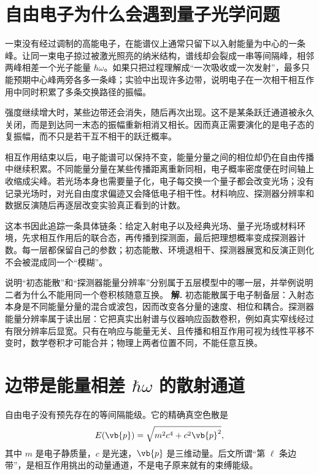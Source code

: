 \section{自由电子为什么会遇到量子光学问题}
\label{chap:feqo-phenomena}

一束没有经过调制的高能电子，在能谱仪上通常只留下以入射能量为中心的一条峰。让同一束电子掠过被激光照亮的纳米结构，谱线却会裂成一串等间隔峰，相邻两峰相差一个光子能量 \(\hbar\omega\)。如果只把过程理解成“一次吸收或一次发射”，最多只能预期中心峰两旁各多一条峰；实验中出现许多边带，说明电子在一次相干相互作用中同时积累了多条交换路径的振幅。

强度继续增大时，某些边带还会消失，随后再次出现。这不是某条跃迁通道被永久关闭，而是到达同一末态的振幅重新相消又相长。因而真正需要演化的是电子态的复振幅，而不只是若干互不相干的跃迁概率。

相互作用结束以后，电子能谱可以保持不变，能量分量之间的相位却仍在自由传播中继续积累。不同能量分量在某些传播距离重新同相，电子概率密度便在时间轴上收缩成尖峰。若光场本身也需要量子化，电子每交换一个量子都会改变光场；没有记录光场时，对光自由度求偏迹又会降低电子相干性。材料响应、探测器分辨率和数据反演随后再逐层改变实验真正看到的计数。

这本书因此追踪一条具体链条：给定入射电子以及经典光场、量子光场或材料环境，先求相互作用后的联合态，再传播到探测面，最后把理想概率变成探测器计数。每一层都保留自己的参数；初态能散、环境退相干、探测器展宽和反演正则化不会被混成同一个“模糊”。


\par
\begin{workedexample}
说明“初态能散”和“探测器能量分辨率”分别属于五层模型中的哪一层，并举例说明二者为什么不能用同一个卷积核随意互换。
\textbf{解.} 初态能散属于电子制备层：入射态本身是不同能量分量的混合或波包，因而改变各分量的速度、相位和耦合。探测器能量分辨率属于读出层：它把真实出射谱与仪器响应函数卷积，例如真实窄线经过有限分辨率后显宽。只有在响应与能量无关、且传播和相互作用可视为线性平移不变时，数学卷积才可能合并；物理上两者位置不同，不能任意互换。
\end{workedexample}
\par
\section{边带是能量相差 \texorpdfstring{$\hbar\omega$}{hbar omega} 的散射通道}

自由电子没有预先存在的等间隔能级。它的精确真空色散是
\begin{equation}
E(\vb{p})=\sqrt{m^2c^4+c^2\vb{p}^2},
\label{eq:feqo-relativistic-dispersion-preview}
\end{equation}
其中 \(m\) 是电子静质量，\(c\) 是光速，\(\vb{p}\) 是三维动量。后文所谓“第 \(\ell\) 条边带”，是相互作用挑出的动量通道，不是电子原来就有的束缚能级。


